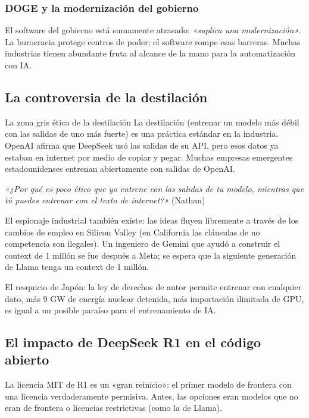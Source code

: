 \subsubsection{DOGE y la modernización del gobierno}

El software del gobierno está sumamente atrasado: \textit{«suplica una modernización»}. La burocracia protege centros de poder; el software rompe esas barreras. Muchas industrias tienen abundante fruta al alcance de la mano para la automatización con IA.

\subsection{La controversia de la destilación}

\begin{knowledgebox}{La zona gris ética de la destilación}
La destilación (entrenar un modelo más débil con las salidas de uno más fuerte) es una práctica estándar en la industria. OpenAI afirma que DeepSeek usó las salidas de su API, pero esos datos ya estaban en internet por medio de copiar y pegar. Muchas empresas emergentes estadounidenses entrenan abiertamente con salidas de OpenAI.

\textit{«¿Por qué es poco ético que yo entrene con las salidas de tu modelo, mientras que tú puedes entrenar con el texto de internet?»} (Nathan)

El espionaje industrial también existe: las ideas fluyen libremente a través de los cambios de empleo en Silicon Valley (en California las cláusulas de no competencia son ilegales). Un ingeniero de Gemini que ayudó a construir el context de 1 millón se fue después a Meta; se espera que la siguiente generación de Llama tenga un context de 1 millón.

El resquicio de Japón: la ley de derechos de autor permite entrenar con cualquier dato, más 9 GW de energía nuclear detenida, más importación ilimitada de GPU, es igual a un posible paraíso para el entrenamiento de IA.
\end{knowledgebox}

\subsection{El impacto de DeepSeek R1 en el código abierto}

La licencia MIT de R1 es un «gran reinicio»: el primer modelo de frontera con una licencia verdaderamente permisiva. Antes, las opciones eran modelos que no eran de frontera o licencias restrictivas (como la de Llama).

